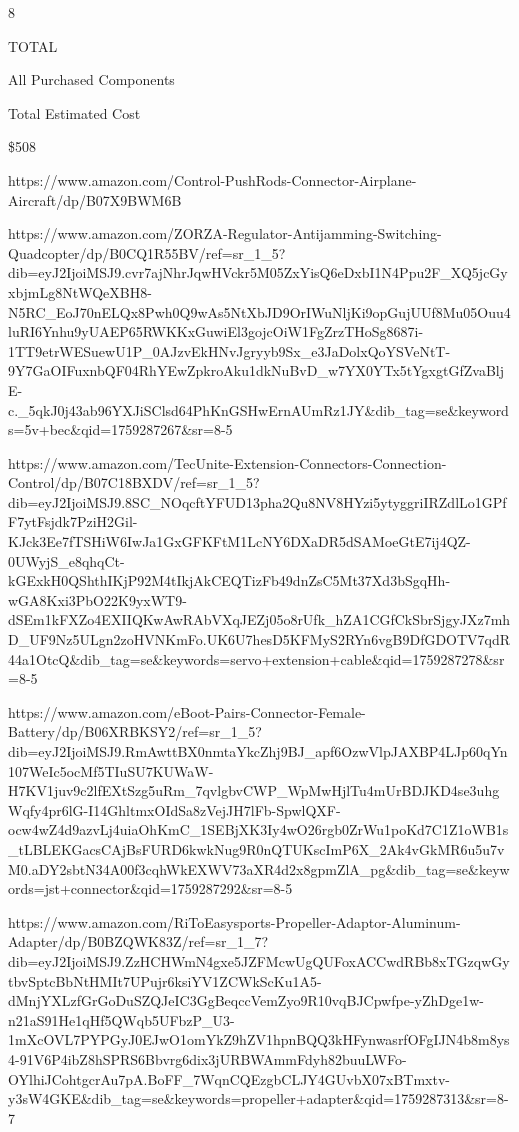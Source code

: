 \documentclass[11pt,letterpaper]{article}
\begin{document}
8\par

TOTAL\par

All Purchased Components\par

Total Estimated Cost\par

\$508\par

https://www.amazon.com/Control-PushRods-Connector-Airplane-Aircraft/dp/B07X9BWM6B\par

https://www.amazon.com/ZORZA-Regulator-Antijamming-Switching-Quadcopter/dp/B0CQ1R55BV/ref=sr\_1\_5?dib=eyJ2IjoiMSJ9.cvr7ajNhrJqwHVckr5M05ZxYisQ6eDxbI1N4Ppu2F\_XQ5jcGyxbjmLg8NtWQeXBH8-N5RC\_EoJ70nELQx8Pwh0Q9wAs5NtXbJD9OrIWuNljKi9opGujUUf8Mu05Ouu4luRI6Ynhu9yUAEP65RWKKxGuwiEl3gojcOiW1FgZrzTHoSg8687i-1TT9etrWESuewU1P\_0AJzvEkHNvJgryyb9Sx\_e3JaDolxQoYSVeNtT-9Y7GaOIFuxnbQF04RhYEwZpkroAku1dkNuBvD\_w7YX0YTx5tYgxgtGfZvaBljE-c.\_5qkJ0j43ab96YXJiSClsd64PhKnGSHwErnAUmRz1JY\&dib\_tag=se\&keywords=5v+bec\&qid=1759287267\&sr=8-5\par

https://www.amazon.com/TecUnite-Extension-Connectors-Connection-Control/dp/B07C18BXDV/ref=sr\_1\_5?dib=eyJ2IjoiMSJ9.8SC\_NOqcftYFUD13pha2Qu8NV8HYzi5ytyggriIRZdlLo1GPfF7ytFsjdk7PziH2Gil-KJck3Ee7fTSHiW6IwJa1GxGFKFtM1LcNY6DXaDR5dSAMoeGtE7ij4QZ-0UWyjS\_e8qhqCt-kGExkH0QShthIKjP92M4tIkjAkCEQTizFb49dnZsC5Mt37Xd3bSgqHh-wGA8Kxi3PbO22K9yxWT9-dSEm1kFXZo4EXIIQKwAwRAbVXqJEZj05o8rUfk\_hZA1CGfCkSbrSjgyJXz7mhD\_UF9Nz5ULgn2zoHVNKmFo.UK6U7hesD5KFMyS2RYn6vgB9DfGDOTV7qdR44a1OtcQ\&dib\_tag=se\&keywords=servo+extension+cable\&qid=1759287278\&sr=8-5\par

https://www.amazon.com/eBoot-Pairs-Connector-Female-Battery/dp/B06XRBKSY2/ref=sr\_1\_5?dib=eyJ2IjoiMSJ9.RmAwttBX0nmtaYkcZhj9BJ\_apf6OzwVlpJAXBP4LJp60qYn107WeIc5ocMf5TIuSU7KUWaW-H7KV1juv9c2lfEXtSzg5uRm\_7qvlgbvCWP\_WpMwHjlTu4mUrBDJKD4se3uhgWqfy4pr6lG-I14GhltmxOIdSa8zVejJH7lFb-SpwlQXF-ocw4wZ4d9azvLj4uiaOhKmC\_1SEBjXK3Iy4wO26rgb0ZrWu1poKd7C1Z1oWB1s\_tLBLEKGacsCAjBsFURD6kwkNug9R0nQTUKscImP6X\_2Ak4vGkMR6u5u7vM0.aDY2sbtN34A00f3cqhWkEXWV73aXR4d2x8gpmZlA\_pg\&dib\_tag=se\&keywords=jst+connector\&qid=1759287292\&sr=8-5\par

https://www.amazon.com/RiToEasysports-Propeller-Adaptor-Aluminum-Adapter/dp/B0BZQWK83Z/ref=sr\_1\_7?dib=eyJ2IjoiMSJ9.ZzHCHWmN4gxe5JZFMcwUgQUFoxACCwdRBb8xTGzqwGytbvSptcBbNtHMIt7UPujr6ksiYV1ZCWkScKu1A5-dMnjYXLzfGrGoDuSZQJeIC3GgBeqccVemZyo9R10vqBJCpwfpe-yZhDge1w-n21aS91He1qHf5QWqb5UFbzP\_U3-1mXcOVL7PYPGyJ0EJwO1omYkZ9hZV1hpnBQQ3kHFynwasrfOFgIJN4b8m8ys4-91V6P4ibZ8hSPRS6Bbvrg6dix3jURBWAmmFdyh82buuLWFo-OYlhiJCohtgcrAu7pA.BoFF\_7WqnCQEzgbCLJY4GUvbX07xBTmxtv-y3sW4GKE\&dib\_tag=se\&keywords=propeller+adapter\&qid=1759287313\&sr=8-7\par
\end{document}
